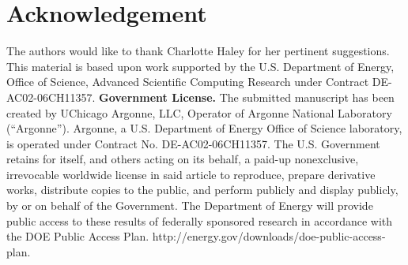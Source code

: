 \documentclass[AMS,STIX1COL]{WileyNJD-v2}
\begin{document}
\section*{Acknowledgement}
 The authors would like to thank Charlotte Haley for her pertinent suggestions. This material is based upon work supported by the
U.S. Department of Energy, Office of Science, Advanced Scientific
Computing Research under Contract DE-AC02-06CH11357. 
{\bf Government License.}  The submitted manuscript has been created by
UChicago Argonne, LLC, Operator of Argonne National Laboratory
(``Argonne''). Argonne, a U.S. Department of Energy Office of Science
laboratory, is operated under Contract No. DE-AC02-06CH11357. The
U.S. Government retains for itself, and others acting on its behalf, a
paid-up nonexclusive, irrevocable worldwide license in said article to
reproduce, prepare derivative works, distribute copies to the public,
and perform publicly and display publicly, by or on behalf of the
Government.  The Department of Energy will provide public access to
these results of federally sponsored research in accordance with the
DOE Public Access
Plan. http://energy.gov/downloads/doe-public-access-plan.
\appendix
\end{document}
